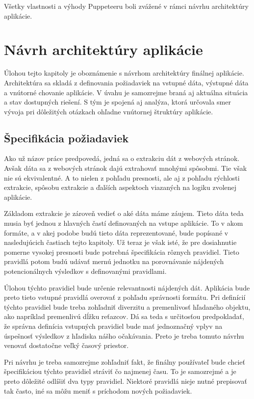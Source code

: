 Všetky vlastnosti a výhody Puppeteeru boli zvážené v rámci návrhu architektúry aplikácie.

\chapter{Návrh architektúry aplikácie}
\label{Navrh}
Úlohou tejto kapitoly je oboznámenie s návrhom architektúry finálnej aplikácie. Architektúra sa skladá z definovania požiadaviek na vstupné dáta, výstupné dáta a vnútorné chovanie aplikácie. V úvahu je samozrejme braná aj aktuálna situácia a stav dostupných riešení.  S tým je spojená aj analýza, ktorá určovala smer vývoja pri dôležitých otázkach ohľadne vnútornej štruktúry aplikácie.

\section{Špecifikácia požiadaviek}

Ako už názov práce predpovedá, jedná sa o extrakciu dát z webových stránok. Avšak dáta sa z webových stránok dajú extrahovať mnohými spôsobmi. Tie však nie sú ekvivalentné. A to nielen z pohľadu presnosti, ale aj z pohľadu rýchlosti extrakcie, spôsobu extrakcie a ďalších aspektoch viazaných na logiku zvolenej aplikácie.

Základom extrakcie je zároveň vedieť o aké dáta máme záujem. Tieto dáta teda musia byť jednou z hlavných častí definovaných na vstupe aplikácie. To v akom formáte, a v akej podobe budú tieto dáta reprezentované, bude popísané v nasledujúcich častiach tejto kapitoly. Už teraz je však isté, že pre dosiahnutie pomerne vysokej presnosti bude potrebná špecifikácia rôznych pravidiel. Tieto pravidlá potom budú udávať mernú jednotku na porovnávanie nájdených potencionálnych výsledkov s definovanými pravidlami.

Úlohou týchto pravidiel bude určenie relevantnosti nájdených dát. Aplikácia bude preto tieto vstupné pravidlá overovať z pohľadu správnosti formátu. Pri definícií týchto pravidiel bude treba zohľadniť diverzitu a premenlivosť hľadaného objektu, ako napríklad premenlivú dĺžku reťazcov. Dá sa teda s určitosťou predpokladať, že správna definícia vstupných pravidiel bude mať jednoznačný vplyv na úspešnosť výsledkov z hľadiska nášho očakávania. Preto je treba tomuto návrhu venovať dostatočne veľký časový priestor.

Pri návrhu je treba samozrejme zohľadniť fakt, že finálny používateľ bude chcieť špecifikáciou týchto pravidiel stráviť čo najmenej času. To je samozrejmé a je preto dôležité odlíšiť dva typy pravidiel. Niektoré pravidlá nieje nutné prepisovať tak často, iné sa môžu meniť s príchodom nových požiadaviek.

